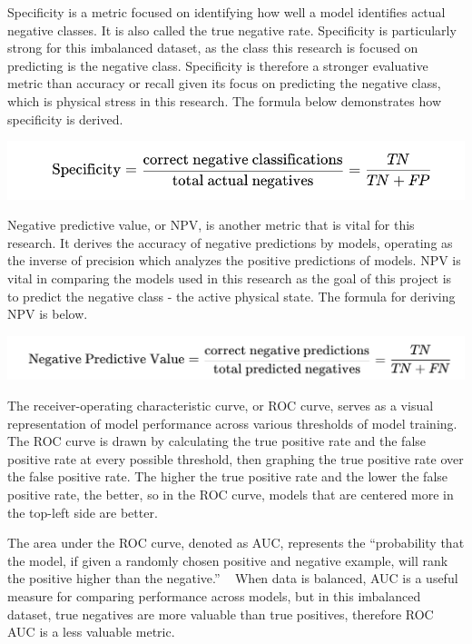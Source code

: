\documentclass{article}
\begin{document}
Specificity is a metric focused on identifying how well a model identifies actual negative classes. It is also called the true negative rate. Specificity is particularly strong for this imbalanced dataset, as the class this research is focused on predicting is the negative class. Specificity is therefore a stronger evaluative metric than accuracy or recall given its focus on predicting the negative class, which is physical stress in this research. The formula below demonstrates how specificity is derived. 

\begin{center}
    \includegraphics[scale = .45]{images/specificity.png}
\end{center}

Negative predictive value, or NPV, is another metric that is vital for this research. It derives the accuracy of negative predictions by models, operating as the inverse of precision which analyzes the positive predictions of models. NPV is vital in comparing the models used in this research as the goal of this project is to predict the negative class - the active physical state. The formula for deriving NPV is below. 

\begin{center}
    \includegraphics[scale = .40]{images/NPV.png}
\end{center}

The receiver-operating characteristic curve, or ROC curve, serves as a visual representation of model performance across various thresholds of model training. The ROC curve is drawn by calculating the true positive rate and the false positive rate at every possible threshold, then graphing the true positive rate over the false positive rate. The higher the true positive rate and the lower the false positive rate, the better, so in the ROC curve,  models that are centered more in the top-left side are better.

The area under the ROC curve, denoted as AUC, represents the “probability that the model, if given a randomly chosen positive and negative example, will rank the positive higher than the negative.” ~\cite{googleML} When data is balanced, AUC is a useful measure for comparing performance across models, but in this imbalanced dataset, true negatives are more valuable than true positives, therefore ROC AUC is a less valuable metric. 
\end{document}
